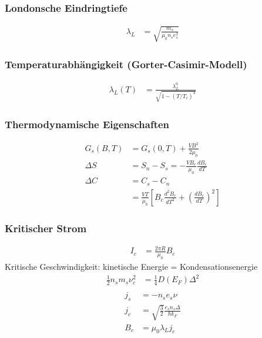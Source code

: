 \subsubsection*{Londonsche Eindringtiefe}
\begin{equation*}
    \begin{aligned}
        \lambda_L &= \sqrt{\frac{m_s}{\mu_0 n_s e_s^2}}
    \end{aligned}
\end{equation*}

\subsubsection*{Temperaturabhängigkeit (Gorter-Casimir-Modell)}
\begin{equation*}
    \begin{aligned}
        \lambda_L (T) &= \frac{\lambda_L^0}{\sqrt{1- (T/T_c)^4}}
    \end{aligned}
\end{equation*}

\subsubsection*{Thermodynamische Eigenschaften}
\begin{equation*}
    \begin{aligned}
        G_s(B,T) &= G_s(0,T) + \frac{V B^2}{2 \mu_0} \\
        \Delta S &= S_n - S_s = - \frac{V B_c}{\mu_0} \frac{d B_c}{dT} \\
        \Delta C &= C_s - C_n \\
            &= \frac{VT}{\mu_0} \left[B_c \frac{d^2 B_c}{dT^2} + \left(\frac{dB_c}{dT}\right)^2\right]
    \end{aligned}
\end{equation*}

\subsubsection*{Kritischer Strom}
\begin{equation*}
    \begin{aligned}
        I_c &= \frac{2 \pi R}{\mu_0} B_c
    \end{aligned}
\end{equation*}
Kritische Geschwindigkeit: kinetische Energie = Kondensationsenergie
\begin{equation*}
    \begin{aligned}
        \frac{1}{2} n_s m_s \nu_c^2 &= \frac{1}{4} D(E_F) \Delta^2 \\
    \end{aligned}
\end{equation*}
\begin{equation*}
    \begin{aligned}
        j_s &= -n_s e_s \nu \\
        j_c &= \sqrt{\frac{3}{2}} \frac{e_s n_s \Delta}{\hbar k_F} \\
        B_c &= \mu_0 \lambda_L j_c
    \end{aligned}
\end{equation*}